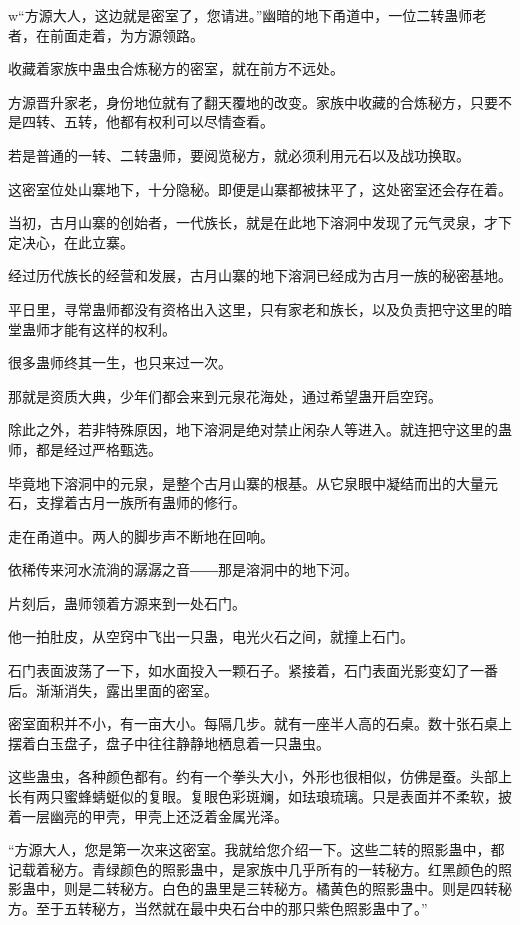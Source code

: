 
\begin{this_body}

w“方源大人，这边就是密室了，您请进。”幽暗的地下甬道中，一位二转蛊师老者，在前面走着，为方源领路。

收藏着家族中蛊虫合炼秘方的密室，就在前方不远处。

方源晋升家老，身份地位就有了翻天覆地的改变。家族中收藏的合炼秘方，只要不是四转、五转，他都有权利可以尽情查看。

若是普通的一转、二转蛊师，要阅览秘方，就必须利用元石以及战功换取。

这密室位处山寨地下，十分隐秘。即便是山寨都被抹平了，这处密室还会存在着。

当初，古月山寨的创始者，一代族长，就是在此地下溶洞中发现了元气灵泉，才下定决心，在此立寨。

经过历代族长的经营和发展，古月山寨的地下溶洞已经成为古月一族的秘密基地。

平日里，寻常蛊师都没有资格出入这里，只有家老和族长，以及负责把守这里的暗堂蛊师才能有这样的权利。

很多蛊师终其一生，也只来过一次。

那就是资质大典，少年们都会来到元泉花海处，通过希望蛊开启空窍。

除此之外，若非特殊原因，地下溶洞是绝对禁止闲杂人等进入。就连把守这里的蛊师，都是经过严格甄选。

毕竟地下溶洞中的元泉，是整个古月山寨的根基。从它泉眼中凝结而出的大量元石，支撑着古月一族所有蛊师的修行。

走在甬道中。两人的脚步声不断地在回响。

依稀传来河水流淌的潺潺之音――那是溶洞中的地下河。

片刻后，蛊师领着方源来到一处石门。

他一拍肚皮，从空窍中飞出一只蛊，电光火石之间，就撞上石门。

石门表面波荡了一下，如水面投入一颗石子。紧接着，石门表面光影变幻了一番后。渐渐消失，露出里面的密室。

密室面积并不小，有一亩大小。每隔几步。就有一座半人高的石桌。数十张石桌上摆着白玉盘子，盘子中往往静静地栖息着一只蛊虫。

这些蛊虫，各种颜色都有。约有一个拳头大小，外形也很相似，仿佛是蚕。头部上长有两只蜜蜂蜻蜓似的复眼。复眼色彩斑斓，如珐琅琉璃。只是表面并不柔软，披着一层幽亮的甲壳，甲壳上还泛着金属光泽。

“方源大人，您是第一次来这密室。我就给您介绍一下。这些二转的照影蛊中，都记载着秘方。青绿颜色的照影蛊中，是家族中几乎所有的一转秘方。红黑颜色的照影蛊中，则是二转秘方。白色的蛊里是三转秘方。橘黄色的照影蛊中。则是四转秘方。至于五转秘方，当然就在最中央石台中的那只紫色照影蛊中了。”


\end{this_body}
